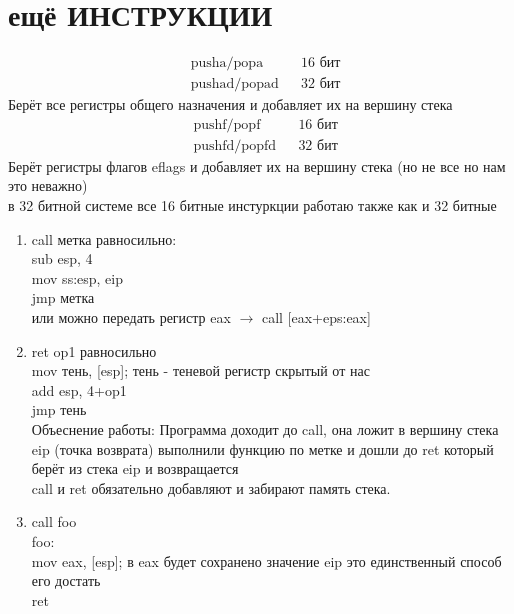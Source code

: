 \documentclass[a4paper, 12pt]{article}
\begin{document}
    \section*{ещё ИНСТРУКЦИИ}
    \begin{align*}
        &\text{pusha/popa} && \text{16 бит} \\
        &\text{pushad/popad} && \text{32 бит} 
    \end{align*}
    Берёт все регистры общего назначения и добавляет их на вершину стека
    \begin{align*}
        &\text{pushf/popf} && \text{16 бит} \\
        &\text{pushfd/popfd} && \text{32 бит} 
    \end{align*}
    Берёт регистры флагов eflags и добавляет их на вершину стека (но не все но нам это неважно) \\
    в 32 битной системе все 16 битные инстуркции работаю также как и 32 битные
    \newpage{}
    \begin{enumerate}
        \item call метка равносильно: \\
        sub esp, 4\\
        mov ss:esp, eip\\
        jmp метка \\
        или можно передать регистр eax $\rightarrow$ call [eax+eps:eax] \\
        \item ret op1 равносильно \\
        mov тень, [esp]; тень - теневой регистр скрытый от нас \\
        add esp, 4+op1 \\
        jmp тень \\
        Объеснение работы:
        Программа доходит до call, она ложит в вершину стека eip (точка возврата) выполнили функцию по метке и дошли до ret  который берёт из стека eip и возвращается \\
        call и ret обязательно добавляют и забирают память стека.
        \\
        \item call foo \\
        foo: \\
            mov eax, [esp]; в eax будет сохранено значение eip это единственный способ его достать \\
            ret
    \end{enumerate}
    \newpage
\end{document}
